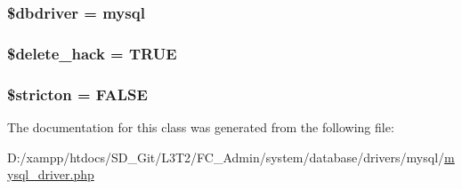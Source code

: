 \subsubsection[{\$dbdriver}]{\setlength{\rightskip}{0pt plus 5cm}\$dbdriver = \textquotesingle{}mysql\textquotesingle{}}\label{class_c_i___d_b__mysql__driver_a0cde2a16322a023d040aa7f725877597}
\hypertarget{class_c_i___d_b__mysql__driver_ad60008f32a478e978c7c3284f320f273}{}
\subsubsection[{\$delete\+\_\+hack}]{\setlength{\rightskip}{0pt plus 5cm}\$delete\+\_\+hack = T\+R\+U\+E}\label{class_c_i___d_b__mysql__driver_ad60008f32a478e978c7c3284f320f273}
\hypertarget{class_c_i___d_b__mysql__driver_afb42d9811bec1da94506e5764e1439e0}{}
\subsubsection[{\$stricton}]{\setlength{\rightskip}{0pt plus 5cm}\$stricton = F\+A\+L\+S\+E}\label{class_c_i___d_b__mysql__driver_afb42d9811bec1da94506e5764e1439e0}


The documentation for this class was generated from the following file\+:\begin{DoxyCompactItemize}
\item 
D\+:/xampp/htdocs/\+S\+D\+\_\+\+Git/\+L3\+T2/\+F\+C\+\_\+\+Admin/system/database/drivers/mysql/\hyperlink{mysql__driver_8php}{mysql\+\_\+driver.\+php}\end{DoxyCompactItemize}
